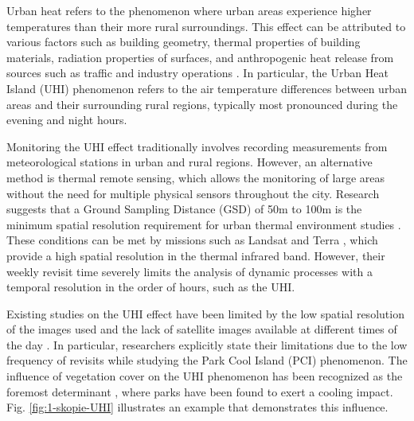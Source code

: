     Urban heat refers to the phenomenon where urban areas experience higher temperatures than their more rural surroundings.
    This effect can be attributed to various factors such as building geometry, thermal properties of building materials, radiation properties of surfaces, and anthropogenic heat release from sources such as traffic and industry operations \cite{deilami2018urban}. 
    In particular,  the Urban Heat Island (UHI) phenomenon refers to the air temperature differences between urban areas and their surrounding rural regions, typically most pronounced during the evening and night hours. 

    Monitoring the UHI effect traditionally involves recording measurements from meteorological stations in urban and rural regions.
    However, an alternative method is thermal remote sensing, which allows the monitoring of large areas without the need for multiple physical sensors throughout the city.
    Research suggests that a Ground Sampling Distance (GSD) of 50m to 100m is the minimum spatial resolution requirement for urban thermal environment studies \cite{mohamed2017land, sobrino2012impact, huang2013generating}. 
    These conditions can be met by missions such as Landsat \cite{USGS2023Landsat} and Terra \cite{terra_nasa}, which provide a high spatial resolution in the thermal infrared band.
    However, their weekly revisit time severely limits the analysis of dynamic processes with a temporal resolution in the order of hours, such as the UHI. 

    Existing studies on the UHI effect have been limited by the low spatial resolution of the images used and the lack of satellite images available at different times of the day \cite{Zhu2021, Shi2019}. 
    In particular, researchers explicitly state their limitations \cite{Shi2019} due to the low frequency of revisits while studying the Park Cool Island (PCI) \cite{Yang2017} phenomenon. 
    The influence of vegetation cover on the UHI phenomenon has been recognized as the foremost determinant \cite{deilami2018urban}, where parks have been found to exert a cooling impact.
    Fig. \ref{fig:1-skopie-UHI} illustrates an example that demonstrates this influence. 
    
